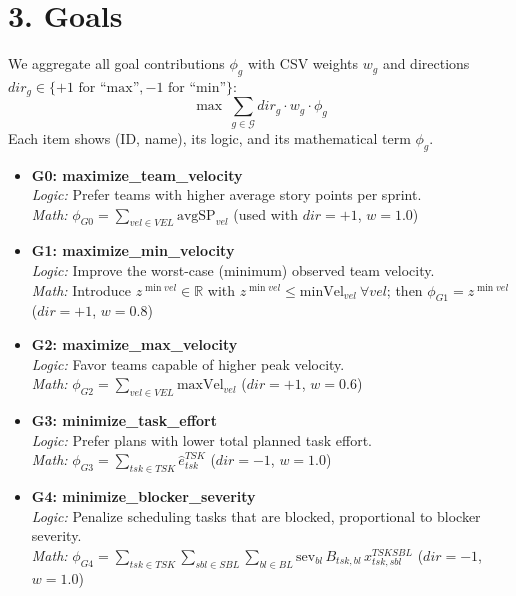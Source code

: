 \documentclass[11pt,a4paper]{article}
\begin{document}
\section{3. Goals}
We aggregate all goal contributions $\phi_g$ with CSV weights $w_g$ and directions $dir_g\in\{+1 \text{ for ``max''}, -1 \text{ for ``min''}\}$:
\[
\max \ \sum_{g\in \mathcal{G}} dir_g \cdot w_g \cdot \phi_g
\]
Each item shows (ID, name), its logic, and its mathematical term $\phi_g$.

\begin{itemize}[leftmargin=2.2em]

  \item \textbf{G0: maximize\_team\_velocity} \\
  \emph{Logic:} Prefer teams with higher average story points per sprint. \\
  \emph{Math:} $\displaystyle \phi_{G0}=\sum_{vel\in VEL}\mathrm{avgSP}_{vel}$ \quad (used with $dir=+1$, $w=1.0$)

  \item \textbf{G1: maximize\_min\_velocity} \\
  \emph{Logic:} Improve the worst-case (minimum) observed team velocity. \\
  \emph{Math:} Introduce $z^{\min vel}\in\mathbb{R}$ with $z^{\min vel}\le \mathrm{minVel}_{vel}\ \forall vel$; then $\phi_{G1}=z^{\min vel}$ \quad ($dir=+1$, $w=0.8$)

  \item \textbf{G2: maximize\_max\_velocity} \\
  \emph{Logic:} Favor teams capable of higher peak velocity. \\
  \emph{Math:} $\displaystyle \phi_{G2}=\sum_{vel\in VEL}\mathrm{maxVel}_{vel}$ \quad ($dir=+1$, $w=0.6$)

  \item \textbf{G3: minimize\_task\_effort} \\
  \emph{Logic:} Prefer plans with lower total planned task effort. \\
  \emph{Math:} $\displaystyle \phi_{G3}=\sum_{tsk\in TSK}\hat{e}^{TSK}_{tsk}$ \quad ($dir=-1$, $w=1.0$)

  \item \textbf{G4: minimize\_blocker\_severity} \\
  \emph{Logic:} Penalize scheduling tasks that are blocked, proportional to blocker severity. \\
  \emph{Math:} $\displaystyle \phi_{G4}=\sum_{tsk\in TSK}\sum_{sbl\in SBL}\sum_{bl\in BL} \mathrm{sev}_{bl}\, B_{tsk,bl}\, x^{TSKSBL}_{tsk,sbl}$ \quad ($dir=-1$, $w=1.0$)


\end{itemize}
\end{document}
